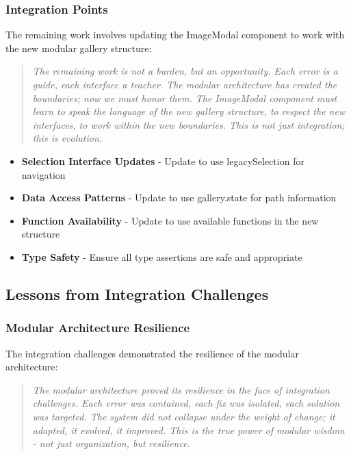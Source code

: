 \documentclass[11pt]{article}
\begin{document}
\subsubsection{Integration Points}

The remaining work involves updating the ImageModal component to work with the new modular gallery structure:

\begin{quote}
\emph{The remaining work is not a burden, but an opportunity. Each error is a guide, each interface a teacher. The modular architecture has created the boundaries; now we must honor them. The ImageModal component must learn to speak the language of the new gallery structure, to respect the new interfaces, to work within the new boundaries. This is not just integration; this is evolution.}
\end{quote}

\begin{itemize}
\item \textbf{Selection Interface Updates} - Update to use legacySelection for navigation
\item \textbf{Data Access Patterns} - Update to use gallery.state for path information
\item \textbf{Function Availability} - Update to use available functions in the new structure
\item \textbf{Type Safety} - Ensure all type assertions are safe and appropriate
\end{itemize}

\subsection{Lessons from Integration Challenges}

\subsubsection{Modular Architecture Resilience}

The integration challenges demonstrated the resilience of the modular architecture:

\begin{quote}
\emph{The modular architecture proved its resilience in the face of integration challenges. Each error was contained, each fix was isolated, each solution was targeted. The system did not collapse under the weight of change; it adapted, it evolved, it improved. This is the true power of modular wisdom - not just organization, but resilience.}
\end{quote}
\end{document}
